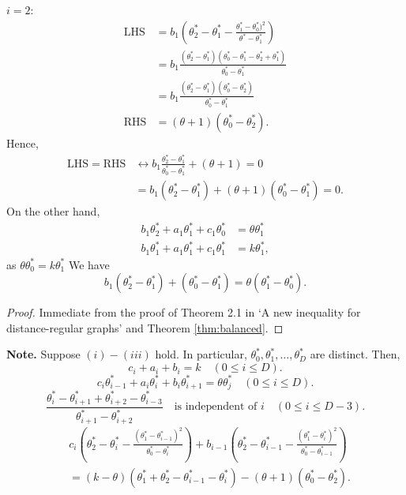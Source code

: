 \documentclass[
]{book}
\theoremstyle{definition}
\theoremstyle{definition}
\theoremstyle{definition}
\theoremstyle{definition}
\theoremstyle{remark}
\begin{document}
\(i=2\):
\begin{align}
\mathrm{LHS} & = b_1\left(\theta^*_2-\theta^*_1 - \frac{\theta^*_1-\theta^*_0)^2}{\theta^*-\theta^*_1}\right)\\
& = b_1\frac{(\theta^*_2-\theta^*_1)(\theta^*_0-\theta^*_1-\theta^*_2+\theta^*_1)}{\theta^*_0-\theta^*_1}\\
& = b_1\frac{(\theta^*_2-\theta^*_1)(\theta^*_0-\theta^*_2)}{\theta^*_0-\theta^*_1}\\
\mathrm{RHS} & = (\theta+1)(\theta^*_0-\theta^*_2).
\end{align}
Hence,
\begin{align}
\mathrm{LHS}=\mathrm{RHS} & \leftrightarrow b_1\frac{\theta^*_2-\theta^*_1}{\theta^*_0-\theta^*_1} + (\theta + 1) = 0\\
& = b_1(\theta^*_2-\theta^*_1)+(\theta+1)(\theta^*_0-\theta^*_1) = 0.
\end{align}
On the other hand,
\begin{align}
b_1\theta^*_2 + a_1\theta^*_1 + c_1\theta^*_0 & = \theta \theta^*_1\\
b_1\theta^*_1 + a_1\theta^*_1 + c_1\theta^*_1 & = k \theta^*_1,
\end{align}
as \(\theta \theta^*_0 = k\theta^*_1\)
We have
\[b_1(\theta^*_2 - \theta^*_1) + (\theta^*_0-\theta^*_1) = \theta(\theta^*_1-\theta^*_0).\]

\begin{proof}
Immediate from the proof of Theorem 2.1 in `A new inequality for distance-regular graphs' \citep{terwilliger:1995} and Theorem \ref{thm:balanced}.
\end{proof}

\textbf{Note.} Suppose \((i)-(iii)\) hold. In particular, \(\theta^*_0, \theta^*_1, \ldots, \theta^*_D\) are distinct. Then,
\[c_i + a_i + b_i = k\quad (0\leq i\leq D).\]
\[c_i\theta^*_{i-1} + a_i\theta^*_i + b_i\theta^*_{i+1} = \theta \theta^*_j \quad (0\leq i\leq D).\]
\[\frac{\theta^*_i-\theta^*_{i+1}+\theta^*_{i+2}-\theta^*_{i-3}}{\theta^*_{i+1}-\theta^*_{i+2}}\quad \text{is independent of $i$}\quad (0\leq i\leq D-3).\]
\begin{align}
& c_i\left(\theta^*_2 - \theta^*_i - \frac{(\theta^*_1-\theta^*_{i-1})^2}{\theta^*_0-\theta^*_i}\right) + b_{i-1}\left(\theta^*_2 - \theta^*_{i-1} - \frac{(\theta^*_1-\theta^*_{i})^2}{\theta^*_0-\theta^*_{i-1}}\right)\\
& = (k-\theta)(\theta^*_1+\theta^*_2-\theta^*_{i-1}-\theta^*_i)-(\theta+1)(\theta^*_0-\theta^*_2).
\end{align}
\end{document}
